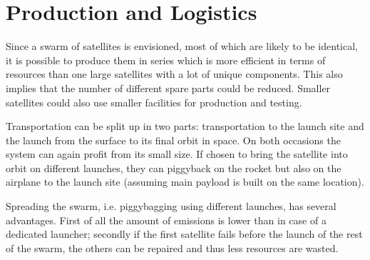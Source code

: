 \section{Production and Logistics}
\label{blSSPRO}

Since a swarm of satellites is envisioned, most of which are likely to be identical, it is possible to produce them in series which is more efficient in terms of resources than one large satellites with a lot of unique components. This also implies that the number of different spare parts could be reduced. Smaller satellites could also use smaller facilities for production and testing. 

Transportation can be split up in two parts: transportation to the launch site and the launch from the surface to its final orbit in space. On both occasions the system can again profit from its small size. If chosen to bring the satellite into orbit on different launches, they can piggyback on the rocket but also on the airplane to the launch site (assuming main payload is built on the same location).

Spreading the swarm, i.e. piggybagging using different launches, has several advantages. First of all the amount of emissions is lower than in case of a dedicated launcher; secondly if the first satellite fails before the launch of the rest of the swarm, the others can be repaired and thus less resources are wasted.